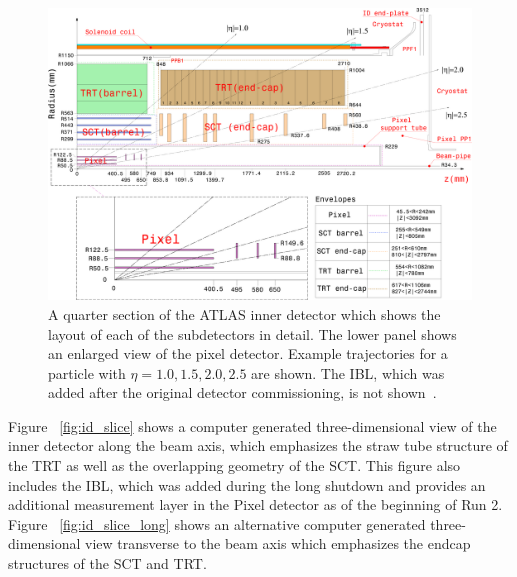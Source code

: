 
\begin{figure}[hbtp]
\centering
\includegraphics[width=\fullfig]{figures/id_detail_schematic.pdf}
\caption{A quarter section of the ATLAS inner detector which shows the layout of each of the subdetectors in detail. The lower panel shows an enlarged view of the pixel detector. Example trajectories for a particle with $\eta = 1.0, 1.5, 2.0, 2.5$ are shown. The \acs*{IBL}, which was added after the original detector commissioning, is not shown~\cite{atlas_experiment}.}
\label{fig:id_detail_schematic}
\end{figure}

Figure ~\ref{fig:id_slice} shows a computer generated three-dimensional view of the inner detector along the beam axis, which emphasizes the straw tube structure of the \ac{TRT} as well as the overlapping geometry of the \ac{SCT}.
This figure also includes the \ac{IBL}, which was added during the long shutdown and provides an additional measurement layer in the Pixel detector as of the beginning of Run 2. 
Figure ~\ref{fig:id_slice_long} shows an alternative computer generated three-dimensional view transverse to the beam axis which emphasizes the endcap structures of the \ac{SCT} and \ac{TRT}. 

